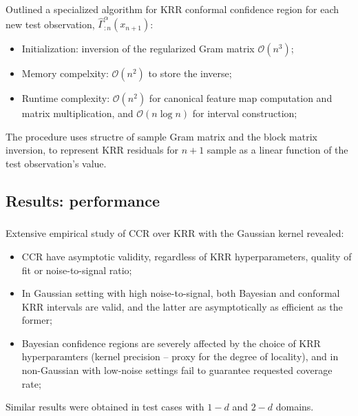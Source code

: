 \documentclass[t]{beamer}  %
\newcommand{\Ocal}{\mathcal{O}}
\begin{document}
\begin{frame}[c]\frametitle{\insertsection}
  \framesubtitle{\insertsubsection}
  Outlined a specialized algorithm for KRR conformal confidence region for each
  new test observation, $\hat{\Gamma}^\alpha_{:n}(x_{n+1})$:
  \begin{itemize}
    \item Initialization: inversion of the regularized Gram matrix $\Ocal(n^3)$;
    \item Memory compelxity: $\mathcal{O}(n^2)$ to store the inverse;
    \item Runtime complexity: $\Ocal(n^2)$ for canonical feature map computation
    and matrix multiplication, and $\Ocal(n \log n)$ for interval construction;
  \end{itemize}

  The procedure uses structre of sample Gram matrix and the block matrix inversion,
  to represent KRR residuals for $n+1$ sample as a linear function of the test
  observation's value.
\end{frame}


\subsection{Results: performance} %
\label{sub:results_performance}

\begin{frame}[c]\frametitle{\insertsection}
  \framesubtitle{\insertsubsection}
  Extensive empirical study of CCR over KRR with the Gaussian kernel revealed:
  \begin{itemize}
    \item CCR have asymptotic validity, regardless of KRR hyperparameters, quality
    of fit or noise-to-signal ratio;
    \item In Gaussian setting with high noise-to-signal, both Bayesian and conformal
    KRR intervals are valid, and the latter are asymptotically as efficient as the
    former;
    \item Bayesian confidence regions are severely affected by the choice of KRR
    hyperparamters (kernel precision -- proxy for the degree of locality), and
    in non-Gaussian with low-noise settings fail to guarantee requested coverage
    rate;
  \end{itemize}
  Similar results were obtained in test cases with $1-d$ and $2-d$ domains.
\end{frame}
\end{document}
